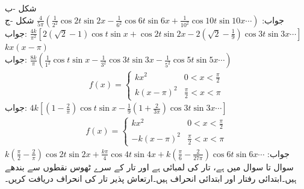 \quad شکل -ب \\
جواب:\quad
$\tfrac{4}{5\pi}(\tfrac{1}{2^2}\cos 2t\sin 2x-\tfrac{1}{6^2}\cos 6t\sin 6x+\tfrac{1}{10^2}\cos 10t\sin 10x\cdots)$
\quad شکل -ج\\
جواب:\quad
$\tfrac{4k}{\pi^2}[2(\sqrt{2}-1)\cos t\sin x +\cos 2t\sin 2x-2(\sqrt{2}-\tfrac{1}{9})\cos 3t\sin 3x\cdots]$
\quad
$kx(x-\pi)$\\
جواب:\quad
$\tfrac{8k}{\pi}(\tfrac{1}{1^2}\cos t\sin x-\tfrac{1}{3^2}\cos 3t\sin 3x-\tfrac{1}{5^2}\cos 5t\sin 5x\cdots)$
\quad 
\begin{align*}
f(x)=
\begin{cases}
kx^2&0<x<\frac{\pi}{2}\\
k(x-\pi)^2&\frac{\pi}{2}<x<\pi
\end{cases}
\end{align*}
جواب:\quad
$4k[(1-\tfrac{2}{\pi})\cos t\sin x-\tfrac{1}{9}(1+\tfrac{2}{3\pi})\cos 3t\sin 3x\cdots]$
\quad 
\begin{align*}
f(x)=
\begin{cases}
kx^2&0<x<\frac{\pi}{2}\\
-k(x-\pi)^2&\frac{\pi}{2}<x<\pi
\end{cases}
\end{align*}
جواب:\quad
$k(\tfrac{\pi}{2}-\tfrac{2}{\pi})\cos 2t\sin 2x+\tfrac{k\pi}{4}\cos 4t\sin 4x+k(\tfrac{\pi}{6}-\tfrac{2}{27\pi})\cos 6t\sin 6x\cdots$
سوال  تا سوال  میں  ہے، تار کی لمبائی  ہے اور تار کے سرے ٹھوس نقطوں سے بندھے ہیں۔ابتدائی رفتار  اور ابتدائی انحراف  ہیں۔ارتعاش پذیر تار کی انحراف  دریافت کریں۔

